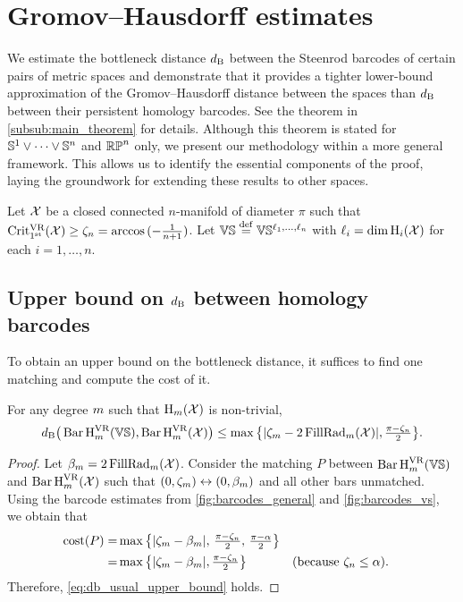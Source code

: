 
\section{Gromov--Hausdorff estimates}\label{prop:db estimate}

We estimate the bottleneck distance $\db$ between the Steenrod barcodes of certain pairs of metric spaces and demonstrate that it provides a tighter lower-bound approximation of the Gromov–Hausdorff distance between the spaces than $\db$ between their persistent homology barcodes.
See the theorem in \cref{subsub:main_theorem} for details.
Although this theorem is stated for $\bS^1\vee\dots\vee \bS^n$ and $\rp^n$ only, we present our methodology within a more general framework.
This allows us to identify the essential components of the proof, laying the groundwork for extending these results to other spaces.

Let $\cX$ be a closed connected \(n\)-manifold of diameter $\pi$ such that $\crit(\cX) \geq \zeta_n = \arccos{(-\tfrac{1}{n+1})}$.
Let $\VS \defeq \VS^{\ell_1, \dots, \ell_n}$ with $\ell_i = \dim \opH_i(\cX)$ for each $i = 1,\dots, n$.


\subsection{Upper bound on $\db$ between homology barcodes}
\label{subsub:db_upper_bound}

To obtain an upper bound on the bottleneck distance, it suffices to find one matching and compute the cost of it.

\medskip\proposition
For any degree $\degp$ such that $\opH_\degp(\cX)$ is non-trivial,
\begin{equation}\label{eq:db_usual_upper_bound}
	\db\big(\Hbarc[\field]{\degp}{\VS}, \Hbarc[\field]{\degp}{\cX}\big)
	\leq \max\big\{|\zeta_\degp  - 2\firstdeath{m}{\cX} |, \tfrac{\pi - \zeta_n}{2}\big\}.
\end{equation}

\begin{proof}
    Let $\beta_m = 2\firstdeath{m}{\cX}$.
	Consider the matching $P$ between $\Hbarc[\field]{\degp}{\VS}$ and $\Hbarc[\field]{\degp}{\cX}$ such that $(0,\zeta_\degp ) \leftrightarrow (0, \beta_\degp )$ and all other bars unmatched.
	Using the barcode estimates from \cref{fig:barcodes_general} and \cref{fig:barcodes_vs}, we obtain that %
	\begin{align*}
		\cost(P)
		= & \max\big\{|\zeta_\degp  - \beta_\degp |,\, \tfrac{\pi - \zeta_n}{2},\, \tfrac{\pi - \alpha}{2}\big\} \\
		= & \max\big\{|\zeta_\degp  - \beta_\degp |, \tfrac{\pi - \zeta_n}{2}\big\} && \mbox{(because $\zeta_n \leq \alpha$)}.
	\end{align*}
	Therefore, \cref{eq:db_usual_upper_bound} holds.
\end{proof}


